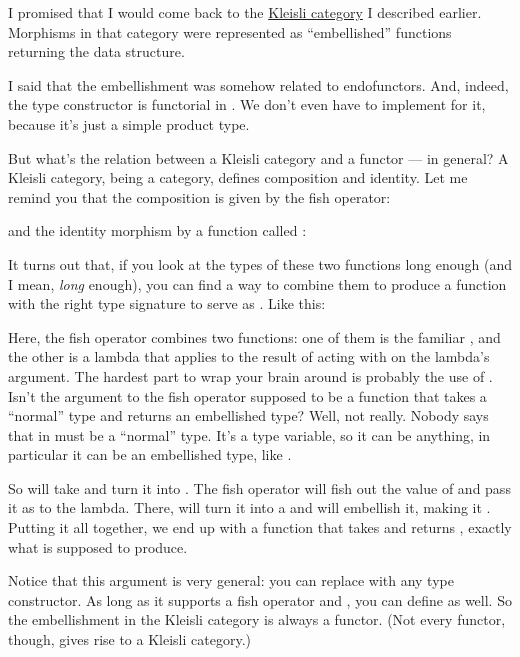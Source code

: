 I promised that I would come back to the \hyperref[kleisli-categories]{Kleisli
category} I described earlier. Morphisms in that category were
represented as ``embellished'' functions returning the 
data structure.

I said that the embellishment was somehow related to endofunctors. And,
indeed, the  type constructor is functorial in
. We don't even have to implement  for it,
because it's just a simple product type.

But what's the relation between a Kleisli category and a functor --- in
general? A Kleisli category, being a category, defines composition and
identity. Let me remind you that the composition is given by the fish
operator:

and the identity morphism by a function called :

It turns out that, if you look at the types of these two functions long
enough (and I mean, \emph{long} enough), you can find a way to combine
them to produce a function with the right type signature to serve as
. Like this:

Here, the fish operator combines two functions: one of them is the
familiar , and the other is a lambda that applies
 to the result of acting with  on the lambda's
argument. The hardest part to wrap your brain around is probably the use
of . Isn't the argument to the fish operator supposed to be a
function that takes a ``normal'' type and returns an embellished type?
Well, not really. Nobody says that  in
 must be a ``normal'' type. It's a
type variable, so it can be anything, in particular it can be an
embellished type, like .

So  will take  and turn it into
. The fish operator will fish out the value of
 and pass it as  to the lambda. There, 
will turn it into a  and  will embellish it,
making it . Putting it all together, we end up with a
function that takes  and returns ,
exactly what  is supposed to produce.

Notice that this argument is very general: you can replace
 with any type constructor. As long as it supports a fish
operator and , you can define  as well. So
the embellishment in the Kleisli category is always a functor. (Not
every functor, though, gives rise to a Kleisli category.)

